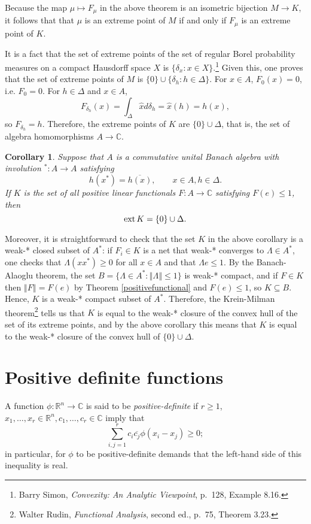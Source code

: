 \documentclass{article}
\newcommand{\ext}{\ensuremath\mathrm{ext}\,}
\newcommand{\norm}[1]{\left\Vert #1 \right\Vert}
\newtheorem{corollary}[theorem]{Corollary}
\theoremstyle{definition}
\begin{document}
Because the map $\mu \mapsto F_\mu$ in the above theorem is an isometric bijection $M \to K$, it follows that that $\mu$ is an extreme point of $M$ if and only if
$F_\mu$ is an extreme point of $K$. 

It is a fact that the set of extreme points of the set of regular Borel probability measures on a compact Hausdorff space $X$
is $\{\delta_x: x \in X\}$.\footnote{Barry Simon, {\em Convexity: An Analytic Viewpoint}, p.~128, Example 8.16.} Given this, one proves that the set of extreme points
of $M$ is $\{0\} \cup \{\delta_h: h\in \Delta\}$. For $x \in A$, $F_0(x)=0$, i.e. $F_0=0$. For $h \in \Delta$ and $x \in A$,
\[
F_{\delta_h}(x) = \int_\Delta \hat{x} d\delta_h = \hat{x}(h) = h(x),
\]
so $F_{\delta_h}=h$. Therefore, the extreme points of $K$ are $\{0\} \cup \Delta$, that is, the set of algebra homomorphisms $A \to \mathbb{C}$.

\begin{corollary}
Suppose that $A$ is a commutative unital Banach algebra with involution $^*:A \to A$ satisfying 
\[
h(x^*)=\overline{h(x)}, \qquad x \in A, h \in \Delta.
\]
If $K$ is the set of all positive linear functionals $F:A \to \mathbb{C}$ satisfying $F(e) \leq 1$, then
\[
\ext K=\{0\} \cup \Delta.
\]
\end{corollary}

Moreover, it is straightforward to check that the set $K$ in the above corollary is a weak-* closed subset of $A^*$: if $F_i \in K$ is a net that weak-* converges
to $\Lambda \in A^*$, one checks that $\Lambda (xx^*) \geq 0$ for all $x \in A$ and that $\Lambda e \leq 1$. By the Banach-Alaoglu theorem, the set
$B=\{\Lambda \in A^*: \norm{\Lambda} \leq 1\}$ is weak-* compact, and if $F \in K$ then $\norm{F} = F(e)$ by Theorem \ref{positivefunctional} and
$F(e) \leq 1$, so $K \subseteq B$. Hence, $K$ is a weak-* compact subset of $A^*$. Therefore, the Krein-Milman
theorem\footnote{Walter Rudin, {\em Functional Analysis}, second ed., p.~75, Theorem 3.23.} tells us that $K$ is equal to the weak-* closure of the convex
hull of the set of its extreme points, and by the above corollary this means that $K$ is equal to the weak-* closure of
the convex hull of $\{0\} \cup \Delta$. 



\section{Positive definite functions}
A function $\phi:\mathbb{R}^n \to \mathbb{C}$ is said to be {\em positive-definite} if $r \geq 1$, $x_1,\ldots,x_r \in \mathbb{R}^n,c_1,\ldots,c_r \in \mathbb{C}$ imply
that
\[
\sum_{i,j=1}^r c_i \overline{c_j} \phi(x_i-x_j) \geq 0;
\]
in particular, for $\phi$ to be positive-definite demands that the left-hand side of this inequality is real.
\end{document}
